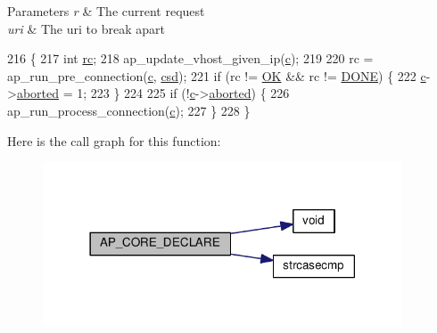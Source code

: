 \begin{DoxyParams}{Parameters}
{\em r} & The current request \\
\hline
{\em uri} & The uri to break apart \\
\hline
\end{DoxyParams}

\begin{DoxyCode}
216 \{
217     \textcolor{keywordtype}{int} \hyperlink{group__APACHE__CORE__CONFIG_ga2e051c0ce9ee165170cd7973f2464512}{rc};
218     ap\_update\_vhost\_given\_ip(\hyperlink{group__APACHE__CORE__HTTPD_ga7cce37ef8558e46f408cb4d0f555605b}{c});
219 
220     rc = ap\_run\_pre\_connection(\hyperlink{group__APACHE__CORE__HTTPD_ga7cce37ef8558e46f408cb4d0f555605b}{c}, \hyperlink{group__APACHE__CORE__CONNECTION_ga37491385bd0907d7a64ed8a3ec309aaa}{csd});
221     \textcolor{keywordflow}{if} (rc != \hyperlink{group__APACHE__CORE__DAEMON_gaba51915c87d64af47fb1cc59348961c9}{OK} && rc != \hyperlink{group__APACHE__CORE__DAEMON_gabe6b865c045f3e7c6892ef4f15ff5779}{DONE}) \{
222         \hyperlink{group__APACHE__CORE__HTTPD_ga7cce37ef8558e46f408cb4d0f555605b}{c}->\hyperlink{structconn__rec_aead9e56515e09e4f4b32a543e988e123}{aborted} = 1;
223     \}
224 
225     \textcolor{keywordflow}{if} (!\hyperlink{group__APACHE__CORE__HTTPD_ga7cce37ef8558e46f408cb4d0f555605b}{c}->\hyperlink{structconn__rec_aead9e56515e09e4f4b32a543e988e123}{aborted}) \{
226         ap\_run\_process\_connection(\hyperlink{group__APACHE__CORE__HTTPD_ga7cce37ef8558e46f408cb4d0f555605b}{c});
227     \}
228 \}
\end{DoxyCode}


Here is the call graph for this function\+:
\nopagebreak
\begin{figure}[H]
\begin{center}
\leavevmode
\includegraphics[width=302pt]{group__MOD__CORE_ga67c82c46d8e12b9b3ccf7c96c288f207_cgraph}
\end{center}
\end{figure}




